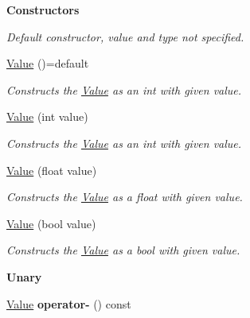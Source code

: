 \begin{Indent}\textbf{ Constructors}\par
{\em Default constructor, value and type not specified. }\begin{DoxyCompactItemize}
\item 
\mbox{\label{class_value_aaa69c4878b9f1ab0326c0f0c845e6774}} 
\hyperlink{class_value_aaa69c4878b9f1ab0326c0f0c845e6774}{Value} ()=default
\begin{DoxyCompactList}\small\item\em Constructs the \hyperlink{class_value}{Value} as an int with given value. \end{DoxyCompactList}\item 
\mbox{\label{class_value_ab6321e070a82a08176ae3181718cc44f}} 
\hyperlink{class_value_ab6321e070a82a08176ae3181718cc44f}{Value} (int value)
\begin{DoxyCompactList}\small\item\em Constructs the \hyperlink{class_value}{Value} as an int with given value. \end{DoxyCompactList}\item 
\mbox{\label{class_value_a15c08f1250b38d595e0b210807aa9071}} 
\hyperlink{class_value_a15c08f1250b38d595e0b210807aa9071}{Value} (float value)
\begin{DoxyCompactList}\small\item\em Constructs the \hyperlink{class_value}{Value} as a float with given value. \end{DoxyCompactList}\item 
\mbox{\label{class_value_a756348e9056bd7b60f983d28c4a1abe5}} 
\hyperlink{class_value_a756348e9056bd7b60f983d28c4a1abe5}{Value} (bool value)
\begin{DoxyCompactList}\small\item\em Constructs the \hyperlink{class_value}{Value} as a bool with given value. \end{DoxyCompactList}\end{DoxyCompactItemize}
\end{Indent}
\begin{Indent}\textbf{ Unary}\par
\begin{DoxyCompactItemize}
\item 
\mbox{\label{class_value_acbe88ccbce6833f9d855f4f99dec6ca1}} 
\hyperlink{class_value}{Value} {\bfseries operator-\/} () const
\end{DoxyCompactItemize}
\end{Indent}
